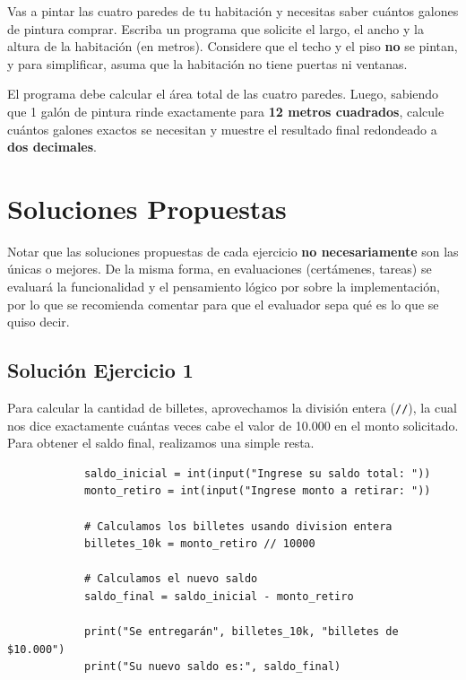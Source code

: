 \documentclass[11pt, a4paper]{article}
\begin{document}
	Vas a pintar las cuatro paredes de tu habitación y necesitas saber cuántos galones de pintura comprar. Escriba un programa que solicite el largo, el ancho y la altura de la habitación (en metros). Considere que el techo y el piso \textbf{no} se pintan, y para simplificar, asuma que la habitación no tiene puertas ni ventanas.
	
	El programa debe calcular el área total de las cuatro paredes. Luego, sabiendo que 1 galón de pintura rinde exactamente para \textbf{12 metros cuadrados}, calcule cuántos galones exactos se necesitan y muestre el resultado final redondeado a \textbf{dos decimales}.
	
	\newpage
	\section{Soluciones Propuestas}
	
	Notar que las soluciones propuestas de cada ejercicio \textbf{no necesariamente} son las únicas o mejores. De la misma forma, en evaluaciones (certámenes, tareas) se evaluará la funcionalidad y el pensamiento lógico por sobre la implementación, por lo que se recomienda comentar para que el evaluador sepa qué es lo que se quiso decir.
	
	\subsection*{Solución Ejercicio 1}
	\begin{solucion}
		Para calcular la cantidad de billetes, aprovechamos la división entera (\texttt{//}), la cual nos dice exactamente cuántas veces cabe el valor de 10.000 en el monto solicitado. Para obtener el saldo final, realizamos una simple resta.
		
		\begin{lstlisting}
			saldo_inicial = int(input("Ingrese su saldo total: "))
			monto_retiro = int(input("Ingrese monto a retirar: "))
			
			# Calculamos los billetes usando division entera
			billetes_10k = monto_retiro // 10000
			
			# Calculamos el nuevo saldo
			saldo_final = saldo_inicial - monto_retiro
			
			print("Se entregarán", billetes_10k, "billetes de $10.000")
			print("Su nuevo saldo es:", saldo_final)
		\end{lstlisting}
	\end{solucion}
	
\end{document}
